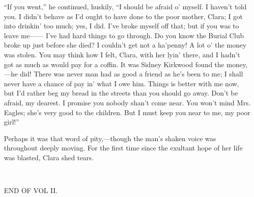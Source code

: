 ``If you went,'' he continued, huskily, ``I should be afraid o' myself.
I haven't told you. I didn't behave as I'd ought to have done to the
poor mother, Clara; I got into drinkin' too much; yes, I did. I've broke
myself off that; but if you was to leave me{{------}} I've had hard
things to go through. Do you know the Burial Club broke up just before
she died? I couldn't get not a ha'penny! A lot o' the money was stolen.
You may think how I felt, Clara, with her lyin' there, and I hadn't got
as much as would pay for a coffin. It was Sidney Kirkwood found the
money,---he did! There was never man had as good a friend as he's been
to me; I shall never have a chance of pay in' what I owe
{\protect\hypertarget{306}{}{}}him. Things is better with me now, but
I'd rather beg my bread in the streets than you should go away. Don't be
afraid, my dearest. I promise you nobody shan't come near. You won't
mind Mrs. Eagles; she's very good to the children. But I must keep you
near to me, my poor girl!''

Perhaps it was that word of pity,---though the man's shaken voice was
throughout deeply moving. For the first time since the exultant hope of
her life was blasted, Clara shed tears.

~

END OF VOL II.
